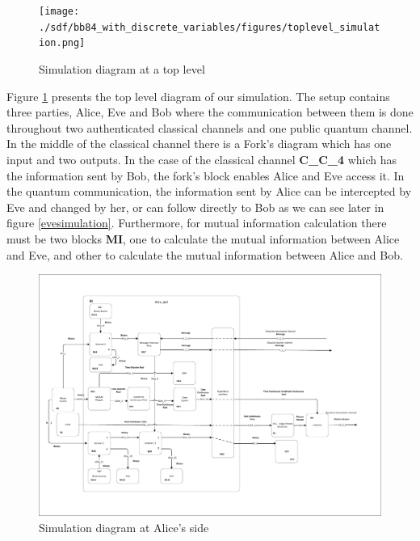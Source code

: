 \begin{figure}[H]
	\centering
	\texttt{[image: ./sdf/bb84\_with\_discrete\_variables/figures/toplevel\_simulation.png]}
	\caption{Simulation diagram at a top level}\label{toplevelsimulation}
\end{figure}

Figure \ref{toplevelsimulation} presents the top level diagram of our simulation. The setup contains three parties, Alice, Eve and Bob where the communication between them is done throughout two authenticated classical channels and one public quantum channel. In the middle of the classical channel there is a Fork's diagram which has one input and two outputs. In the case of the classical channel \textbf{C\_C\_4} which has the information sent by Bob, the fork's block enables Alice and Eve access it. In the quantum communication, the information sent by Alice can be intercepted by Eve and changed by her, or can follow directly to Bob as we can see later in figure \ref{evesimulation}. Furthermore, for mutual information calculation there must be two blocks \textbf{MI}, one to calculate the mutual information between Alice and Eve, and other to calculate the mutual information between Alice and Bob.

\begin{figure}[h]
    \centering
        \includegraphics[clip, trim=0cm 0cm 0cm 0cm, width=1.00\textwidth]{./sdf/bb84_with_discrete_variables/figures_raw/Simulation_Alice_bb84.pdf}
    \caption{Simulation diagram at Alice's side}\label{alicesimulation}
\end{figure}



